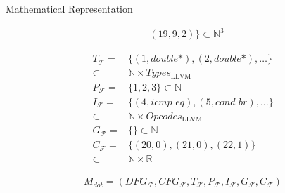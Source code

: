 \begin{blackbox}{Mathematical Representation}
\begin{minipage}{0.329\textwidth}
\begin{graybox}
\begin{align*}
                  &(19,9,2)\}\subset\mathbb N^3
            \end{align*}
        \end{graybox}
    \end{minipage}
    \begin{minipage}{0.329\textwidth}
        \centering
        \begin{graybox}
            \scriptsize
            \setlength{\abovedisplayskip}{0pt}
            \setlength{\belowdisplayskip}{0pt}
            \vspace{-0.5em}
            \begin{align*}
                T_\mathcal F={}&\{(1,\textit{double*}),(2,\textit{double*}),\dots\}\\[-0.5em]
                      \subset{}&\mathbb N\times Types_\text{LLVM}\\[-0.25em]
                P_\mathcal F={}&\{1,2,3\}\subset\mathbb N\\[-0.25em]
                I_\mathcal F={}&\{(4,\textit{icmp eq}),(5,\textit{cond br}),\dots\}\\[-0.5em]
                      \subset{}&\mathbb N\times Opcodes_\text{LLVM}\\[-0.25em]
                G_\mathcal F={}&\{\}\subset\mathbb N\\[-0.25em]
                C_\mathcal F={}&\{(20,0),(21,0),(22,1)\}\\[-0.5em]
                      \subset{}&\mathbb N\times\mathbb R
            \end{align*}

            \vspace{0.45em}
        \end{graybox}
    \end{minipage}

    \begin{minipage}{0.55\textwidth}
        \begin{graybox}
            \setlength{\abovedisplayskip}{0pt}
            \setlength{\belowdisplayskip}{0pt}
            \vspace{-0.5em}
            \begin{align*}
                M_{dot}=(DFG_\mathcal{F},
                 CFG_\mathcal{F},
                 T_\mathcal{F},
                 P_\mathcal{F},
                 I_\mathcal{F},
                 G_\mathcal{F},
                 C_\mathcal{F})
            \end{align*}
        \end{graybox}
    \end{minipage}
\end{blackbox}